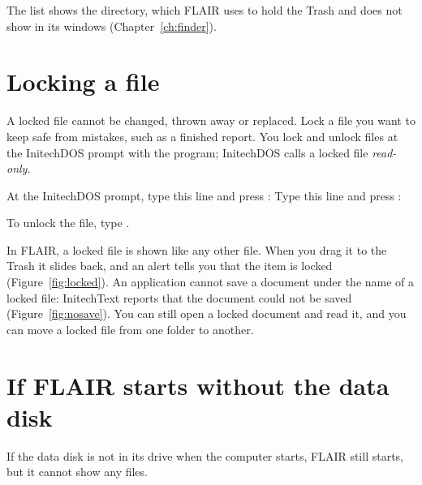
The list shows the  directory, which FLAIR uses to hold the
Trash and does not show in its windows (Chapter~\ref{ch:finder}).

\section{Locking a file}
A locked file cannot be changed, thrown away or replaced.  Lock a file you
want to keep safe from mistakes, such as a finished report.  You lock and
unlock files at the InitechDOS prompt with the  program;
InitechDOS calls a locked file \textit{read-only}.
\begin{TaskSteps}
\Step At the InitechDOS prompt, type this line and press :\newline
{}
\Step Type this line and press :\newline
{}
\end{TaskSteps}


To unlock the file, type .

In FLAIR, a locked file is shown like any other file.  When you drag it to
the Trash it slides back, and an alert tells you that the item is locked
(Figure~\ref{fig:locked}).  An application cannot save a document under the
name of a locked file: InitechText reports that the document could not be
saved (Figure~\ref{fig:nosave}).  You can still open a locked document and
read it, and you can move a locked file from one folder to another.

\section{If FLAIR starts without the data disk}
If the data disk is not in its drive when the computer starts, FLAIR still
starts, but it cannot show any files.


